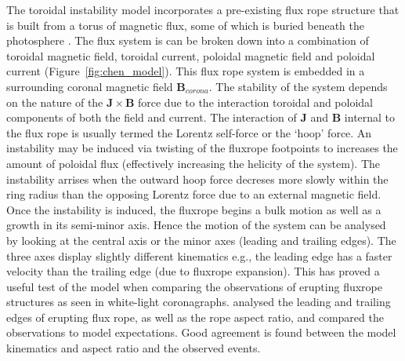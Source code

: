 The toroidal instability model incorporates a pre-existing flux rope structure that is built from a torus of magnetic flux, some of which is buried beneath the photosphere \citep{chen1989}. The flux system is can be broken down into a combination of toroidal magnetic field, toroidal current, poloidal magnetic field and poloidal current (Figure~\ref{fig:chen_model}). This flux rope system is embedded in a surrounding coronal magnetic field $\mathbf{B}_{corona}$. The stability of the system depends on the nature of the $\mathbf{J} \times \mathbf{B}$ force due to the interaction toroidal and poloidal components of both the field and current. The interaction of $\mathbf{J}$ and $\mathbf{B}$ internal to the flux rope is usually termed the Lorentz self-force or the \textquoteleft hoop' force. An instability may be induced via twisting of the fluxrope footpoints to increases the amount of poloidal flux (effectively increasing the helicity of the system). The instability arrises when the outward hoop force decreses more slowly within the ring radius than the opposing Lorentz force due to an external magnetic field. Once the instability is induced, the fluxrope begins a bulk motion as well as a growth in its semi-minor axis. Hence the motion of the system can be analysed by looking at the central axis or the minor axes (leading and trailing edges). The three axes display slightly different kinematics e.g., the leading edge has a faster velocity than the trailing edge (due to fluxrope expansion). This has proved a useful test of the model when comparing the observations of erupting fluxrope structures as seen in white-light coronagraphs. \citet{krall2001} analysed the leading and trailing edges of erupting flux rope, as well as the rope aspect ratio, and compared the observations to model expectations. Good agreement is found between the model kinematics and aspect ratio and the observed events.
